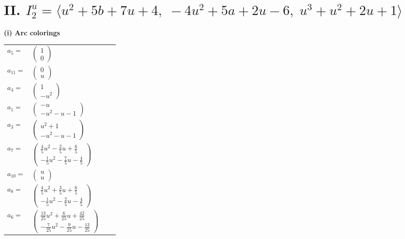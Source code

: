 \documentclass[1p]{elsarticle_modified}
\theoremstyle{definition}
\begin{document}
\centering \section*{II. $I^u_{2}= \langle u^2+5 b+7 u+4,\;-4 u^2+5 a+2 u-6,\;u^3+u^2+2 u+1 \rangle$}
\flushleft \textbf{(i) Arc colorings}\\
\begin{tabular}{m{7pt} m{180pt} m{7pt} m{180pt} }
\flushright $a_{5}=$&$\begin{pmatrix}1\\0\end{pmatrix}$ \\
\flushright $a_{11}=$&$\begin{pmatrix}0\\u\end{pmatrix}$ \\
\flushright $a_{4}=$&$\begin{pmatrix}1\\- u^2\end{pmatrix}$ \\
\flushright $a_{1}=$&$\begin{pmatrix}- u\\- u^2- u-1\end{pmatrix}$ \\
\flushright $a_{3}=$&$\begin{pmatrix}u^2+1\\- u^2- u-1\end{pmatrix}$ \\
\flushright $a_{7}=$&$\begin{pmatrix}\frac{4}{5} u^2-\frac{2}{5} u+\frac{6}{5}\\-\frac{1}{5} u^2-\frac{7}{5} u-\frac{4}{5}\end{pmatrix}$ \\
\flushright $a_{10}=$&$\begin{pmatrix}u\\u\end{pmatrix}$ \\
\flushright $a_{8}=$&$\begin{pmatrix}\frac{4}{5} u^2+\frac{3}{5} u+\frac{6}{5}\\-\frac{1}{5} u^2-\frac{2}{5} u-\frac{4}{5}\end{pmatrix}$ \\
\flushright $a_{6}=$&$\begin{pmatrix}\frac{13}{25} u^2+\frac{6}{25} u+\frac{42}{25}\\-\frac{7}{25} u^2-\frac{9}{25} u-\frac{13}{25}\end{pmatrix}$ \\

\end{tabular}
\end{document}
